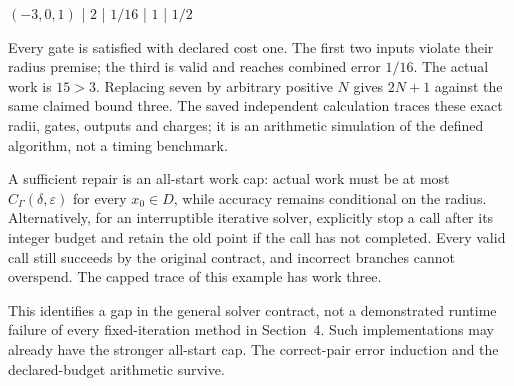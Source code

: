 \documentclass[10pt]{article}
\begin{document}
\((-3,0,1)\) | \(2\) | \(1/16\) | \(1\) | \(1/2\)\par
Every gate is satisfied with declared cost one. The first two inputs violate their radius premise; the third is valid and reaches combined error \(1/16\). The actual work is \(15>3\). Replacing seven by arbitrary positive \(N\) gives \(2N+1\) against the same claimed bound three. The saved independent calculation traces these exact radii, gates, outputs and charges; it is an arithmetic simulation of the defined algorithm, not a timing benchmark.\par
A sufficient repair is an all-start work cap: actual work must be at most \(C_\Gamma(\delta,\varepsilon)\) for every \(x_0\in D\), while accuracy remains conditional on the radius. Alternatively, for an interruptible iterative solver, explicitly stop a call after its integer budget and retain the old point if the call has not completed. Every valid call still succeeds by the original contract, and incorrect branches cannot overspend. The capped trace of this example has work three.\par
This identifies a gap in the general solver contract, not a demonstrated runtime failure of every fixed-iteration method in Section 4. Such implementations may already have the stronger all-start cap. The correct-pair error induction and the declared-budget arithmetic survive.\par
\end{document}
